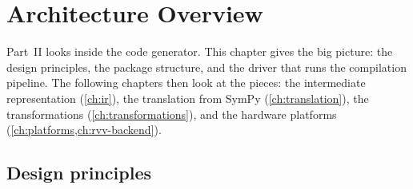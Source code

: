 \chapter{Architecture Overview}\label{ch:architecture}

Part~II looks inside the code generator. This chapter gives the big picture: the
design principles, the package structure, and the driver that runs the compilation
pipeline. The following chapters then look at the pieces: the intermediate
representation (\cref{ch:ir}), the translation from SymPy (\cref{ch:translation}), the
transformations (\cref{ch:transformations}), and the hardware platforms
(\cref{ch:platforms,ch:rvv-backend}).

\section{Design principles}

